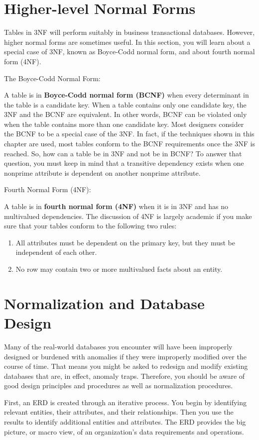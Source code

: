 \documentclass[a4paper, 12pt, titlepage]{report}
\begin{document}
{\section{Higher-level Normal Forms}
Tables in 3NF will perform suitably in business transactional databases. However, higher normal forms are sometimes useful. In this section, you will learn about a special case of 3NF, known as Boyce-Codd normal form, and about fourth normal form (4NF).

The Boyce-Codd Normal Form:

A table is in \textbf{Boyce-Codd normal form (BCNF)} when every determinant in the table is a candidate key. When a table contains only one candidate key, the 3NF and the BCNF are equivalent. In other words, BCNF can be violated only when the table contains more than one candidate key. Most designers consider the BCNF to be a special case of the 3NF. In fact, if the techniques shown in this chapter are used, most tables conform to the BCNF requirements once the 3NF is reached. So, how can a table be in 3NF and not be in BCNF? To answer that question, you must keep in mind that a transitive dependency exists when one nonprime attribute is dependent on another nonprime attribute.

Fourth Normal Form (4NF):

A table is in \textbf{fourth normal form (4NF)} when it is in 3NF and has no multivalued dependencies. The discussion of 4NF is largely academic if you make sure that your tables conform to the following two rules:
\begin{enumerate}
\item All attributes must be dependent on the primary key, but they must be independent
of each other.
\item No row may contain two or more multivalued facts about an entity.
\end{enumerate}
\section{Normalization and Database Design}
Many of the real-world databases you encounter will have been improperly designed or burdened with anomalies if they were improperly modified over the course of time. That means you might be asked to redesign
and modify existing databases that are, in effect, anomaly traps. Therefore, you should be aware of good design principles and procedures as well as normalization procedures.

First, an ERD is created through an iterative process. You begin by identifying relevant entities, their attributes, and their relationships. Then you use the results to identify additional entities and attributes. The ERD provides the big picture, or macro view, of an organization’s data requirements and operations.

}
\end{document}
